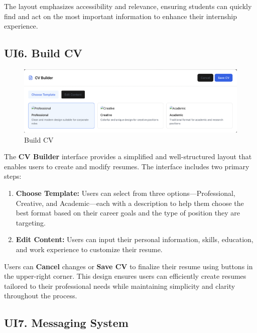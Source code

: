 The layout emphasizes accessibility and relevance, ensuring students can quickly find and act on the most important information to enhance their internship experience.

\subsection{UI6. Build CV}
\label{subsec:build_cv_ui}%

\begin{figure}[H]
    \begin{center}
        \includegraphics[width=0.82\linewidth]{JhaBhatiaSharma/imagesDD/BuildCV.png}
        \caption{Build CV}
        \label{fig:BuildCV}
    \end{center}
\end{figure}

The \textbf{CV Builder} interface provides a simplified and well-structured layout that enables users to create and modify resumes. The interface includes two primary steps:
\begin{enumerate}
    \item \textbf{Choose Template:} Users can select from three options—Professional, Creative, and Academic—each with a description to help them choose the best format based on their career goals and the type of position they are targeting.
    \item \textbf{Edit Content:} Users can input their personal information, skills, education, and work experience to customize their resume.
\end{enumerate}

Users can \textbf{Cancel} changes or \textbf{Save CV} to finalize their resume using buttons in the upper-right corner. This design ensures users can efficiently create resumes tailored to their professional needs while maintaining simplicity and clarity throughout the process.

\subsection{UI7. Messaging System}
\label{subsec:messaging_system_ui}%


